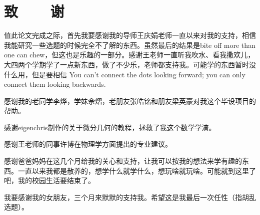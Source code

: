 %
%
%
%
%
%

\chapter*{\vskip 10bp \textmd{致~~~~谢} \vskip -6bp}

值此论文完成之际，首先我要感谢我的导师王庆娟老师一直以来对我的支持，相信我能研究一些选题的时候完全不了解的东西。虽然最后的结果是bite off more than one can chew，但这也是乐趣的一部分。感谢王老师一直听我吹水、看我撒欢儿，大四两个学期学了一点新东西，做了不少乐，老师都支持我。可能学的东西暂时没什么用，但是要相信 You can't connect the dots looking forward; you can only connect them looking backwards\cite{steve_jobs_stanford}.

感谢我的老同学李烨，学妹佘熠，老朋友张皓铭和朋友梁英豪对我这个毕设项目的帮助。

感谢eigenchris制作的关于微分几何的教程，拯救了我这个数学学渣。

感谢王老师的同事许博在物理学方面提出的专业建议。

感谢爸爸妈妈在这几个月给我的关心和支持，让我可以按我的想法来学有趣的东西。一直以来我都是散养的，想学什么就学什么，想玩啥就玩啥。可能就到这里了吧，我的校园生活要结束了。

我要感谢我的女朋友，三个月来默默的支持我。希望这是我最后一次任性（指胡乱选题）。

